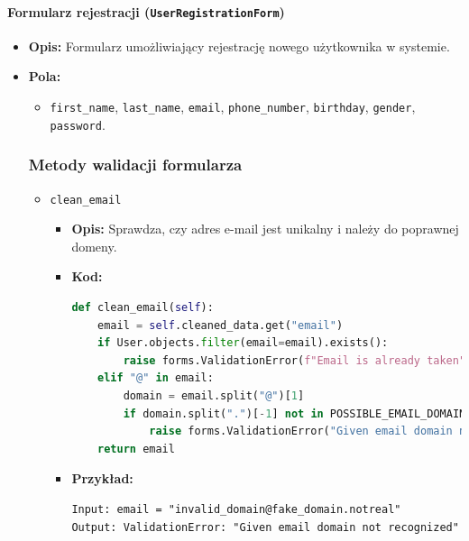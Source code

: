 \documentclass[12pt,a4paper,oneside]{article}
\theoremstyle{definition}
\numberwithin{equation}{section}
\begin{document}
\paragraph{Formularz rejestracji (\texttt{UserRegistrationForm})}

\begin{itemize}
    \item \textbf{Opis:} Formularz umożliwiający rejestrację nowego użytkownika w systemie.
    \item \textbf{Pola:} 
    \begin{itemize}
        \item \texttt{first\_name}, \texttt{last\_name}, \texttt{email}, \texttt{phone\_number}, \texttt{birthday}, \texttt{gender}, \texttt{password}.
    \end{itemize}
    \subsubsection*{Metody walidacji formularza}
    \begin{itemize}
        \item \texttt{clean\_email}
        \begin{itemize}
            \item \textbf{Opis:} Sprawdza, czy adres e-mail jest unikalny i należy do poprawnej domeny.
            \item \textbf{Kod:}
            \begin{lstlisting}[language=Python, caption=Kod metody clean\_email]
def clean_email(self):
    email = self.cleaned_data.get("email")
    if User.objects.filter(email=email).exists():
        raise forms.ValidationError(f"Email is already taken")
    elif "@" in email:
        domain = email.split("@")[1]
        if domain.split(".")[-1] not in POSSIBLE_EMAIL_DOMAIN_TLD:
            raise forms.ValidationError("Given email domain not recognized")
    return email
        \end{lstlisting}
        \item \textbf{Przykład:}
        \begin{verbatim}
Input: email = "invalid_domain@fake_domain.notreal"
Output: ValidationError: "Given email domain not recognized"
            \end{verbatim}
        \end{itemize}
    

\end{itemize}
\end{itemize}
\end{document}
